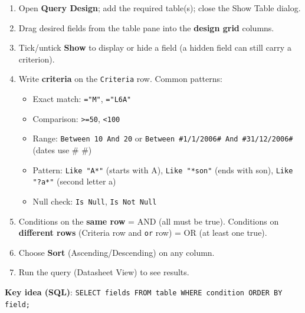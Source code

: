 \documentclass[11pt]{article}
\newcommand{\cle}[1]{{\popxbold\color{popdark}#1}}
\begin{document}
\begin{methode}
\begin{enumerate}
\item Open \textbf{Query Design}; add the required table(s); close the Show Table dialog.
\item Drag desired fields from the table pane into the \textbf{design grid} columns.
\item Tick/untick \textbf{Show} to display or hide a field (a hidden field can still carry a criterion).
\item Write \textbf{criteria} on the \texttt{Criteria} row. Common patterns:
\begin{itemize}
\item Exact match: \texttt{="M"}, \texttt{="L6A"}
\item Comparison: \texttt{>=50}, \texttt{<100}
\item Range: \texttt{Between 10 And 20} or \texttt{Between \#1/1/2006\# And \#31/12/2006\#} (dates use \# \#)
\item Pattern: \texttt{Like "A*"} (starts with A), \texttt{Like "*son"} (ends with son), \texttt{Like "?a*"} (second letter a)
\item Null check: \texttt{Is Null}, \texttt{Is Not Null}
\end{itemize}
\item Conditions on the \textbf{same row} = \cle{AND} (all must be true). Conditions on \textbf{different rows} (Criteria row and \texttt{or} row) = \cle{OR} (at least one true).
\item Choose \textbf{Sort} (Ascending/Descending) on any column.
\item Run the query (Datasheet View) to see results.
\end{enumerate}
\textbf{Key idea (SQL)}: \texttt{SELECT fields FROM table WHERE condition ORDER BY field;}
\end{methode}
\end{document}
